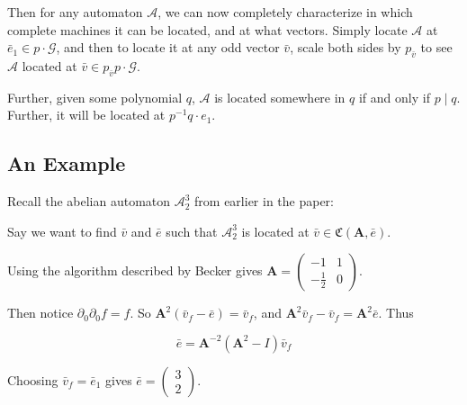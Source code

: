\documentclass[runningheads]{llncs}
\newcommand{\A}{\mathcal{A}}
\newcommand{\G}{\mathcal{G}}
\newcommand{\C}{\mathfrak{C}(\Am,\e)}
\newcommand{\2}{\textbf{2}}
\newcommand{\Am}{\textbf{A}}
\newcommand{\del}{\partial}
\renewcommand{\v}{\bar{v}}
\newcommand{\e}{\bar{e}}
\begin{document}
Then for any automaton $\A$, we can now completely characterize in
which complete machines it can be located, and at what vectors.
Simply locate $\A$ at $\e_1 \in p \cdot \G$, and then to locate it at
any odd vector $\v$, scale both sides by $p_{\v}$ to see $\A$ located at
$\v \in p_{\v} p \cdot \G$.

Further, given some polynomial $q$, $\A$ is located somewhere in $q$ 
if and only if $p \mid q$. Further, it will be located at 
$p^{-1}q \cdot e_1$.

\subsection{An Example}

Recall the abelian automaton $\A^3_2$ from earlier in the paper:

\begin{center}
\end{center}

Say we want to find $\v$ and $\e$ such that $\A^3_2$ is located at 
$\v \in \C$.

Using the algorithm described by Becker gives 
$\Am = \begin{pmatrix} -1 & 1 \\ -\frac{1}{2} & 0 \end{pmatrix}$.

Then notice $\del_0 \del_0 f = f$.
So $\Am^2 (\v_f - \e) = \v_f$, and
$\Am^2 \v_f - \v_f = \Am^2 \e$. Thus

\[ \e = \Am^{-2} (\Am^2 - I) \v_f \]

Choosing $\v_f = \e_1$ gives $\e = \begin{pmatrix} 3 \\ 2 \end{pmatrix}$.
\end{document}
